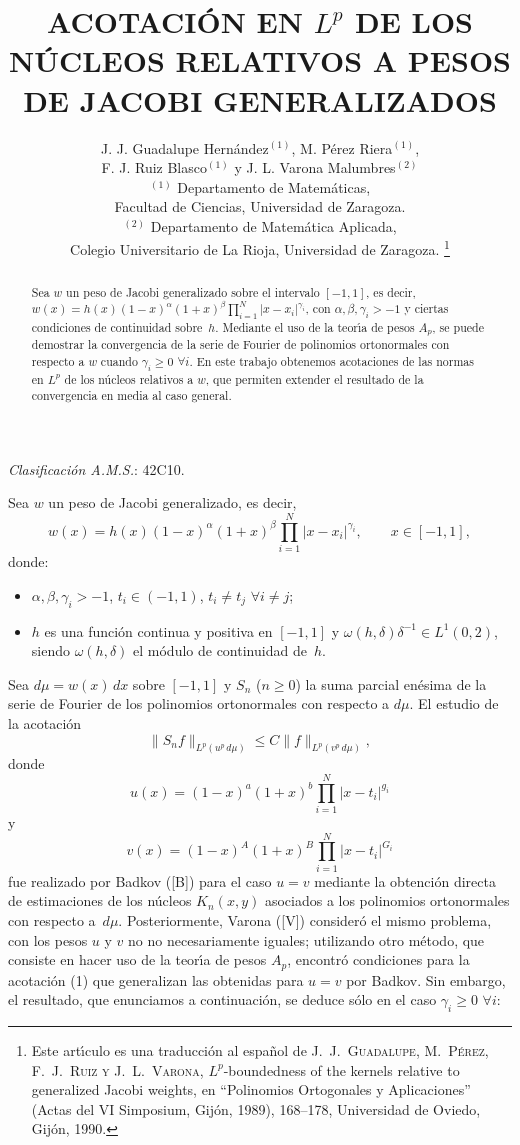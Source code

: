 \documentclass[a4paper,12pt]{article}
\date{}
\title{\large \bfseries \boldmath ACOTACI\'ON EN $L^{p}$ DE LOS N\'UCLEOS
RELATIVOS A PESOS DE JACOBI GENERALIZADOS}
\author{%
J. J. Guadalupe Hern\'andez$^{(1)}$, M. P\'{e}rez Riera$^{(1)}$,\\[2pt]
F. J. Ruiz Blasco$^{(1)}$ y J. L. Varona Malumbres$^{(2)}$\\[5pt]
\small $^{(1)}$ Departamento de Matem\'aticas,\\[-2pt]
\small Facultad de Ciencias, Universidad de Zaragoza.\\[3pt]
\small $^{(2)}$ Departamento de Matem\'atica Aplicada,\\[-2pt]
\small Colegio Universitario de La Rioja, Universidad de Zaragoza.%
\renewcommand\thefootnote{}%
\renewcommand\footnotemark{}%
\footnote{Este art\'{\i}culo es una traducci\'on al espa\~nol de
\textsc{J.~J.~Guadalupe, M.~P\'{e}rez,
F.~J.~Ruiz y J.~L.~Varona},
{$L^{p}$-boundedness of the kernels relative
to generalized Jacobi weights}, en
``Polinomios Ortogonales y Aplicaciones''
(Actas del VI Simposium, Gij\'on, 1989),
168--178, Universidad de Oviedo, Gij\'on, 1990.}%
}
\theoremstyle{plain}
\theoremstyle{definition}
\begin{document}
\maketitle

%

\noindent\textit{Clasificaci\'on A.M.S.}: 42C10.

\begin{abstract}
Sea $w$ un peso de Jacobi generalizado sobre el intervalo $[-1,1]$,
es decir, $w(x) = h(x)(1-x)^{\alpha} (1+x)^{\beta}
\prod_{i=1}^{N} |x-x_{i}|^{\gamma_{i}}$, con $\alpha, \beta,
\gamma_{i} > -1$ y ciertas condiciones de continuidad
sobre~$h$. Mediante el uso de la teor\'{\i}a de pesos $A_{p}$, se puede
demostrar la convergencia de la serie de Fourier de polinomios
ortonormales con respecto a $w$ cuando $\gamma_{i} \geq 0$
$\forall i$. En este trabajo obtenemos acotaciones
de las normas en $L^{p}$ de los n\'ucleos relativos a $w$, que permiten
extender el resultado de la convergencia en media al caso general.
\end{abstract}


Sea $w$ un peso de Jacobi generalizado, es decir,
$$
w(x) = h(x)(1-x)^{\alpha} (1+x)^{\beta}
\prod_{i=1}^{N} |x-x_{i}|^{\gamma_{i}},
\qquad x \in [-1,1],
$$
donde:
\begin{itemize}
\item[(a)] $\alpha, \beta, \gamma_{i} > -1$,
$t_{i} \in (-1,1)$, $t_{i}\neq t_{j}$ $\forall i \neq j$;
\item[(b)] $h$ es una funci\'on continua y positiva en $[-1,1]$ y
$\omega(h,\delta) \delta^{-1} \in L^{1}(0,2)$,
siendo $\omega(h,\delta)$ el m\'odulo de continuidad de~$h$.
\end{itemize}

Sea $d\mu = w(x)\,dx$ sobre $[-1,1]$ y $S_{n}$ ($n \geq 0$)
la suma parcial en\'{e}sima de la serie de Fourier de los polinomios
ortonormales con respecto a $d\mu$. El estudio de la acotaci\'on
\begin{equation}
\| S_{n}f \|_{L^{p}(u^{p}\,d\mu)}
\leq C \| f \|_{L^{p}(v^{p}\,d\mu)},
\tag{1}
\end{equation}
donde
$$
u(x) = (1- x)^{a}(1+ x)^{b} \prod_{i=1}^{N} | x- t_{i} |^{g_{i}}
$$
y
$$
v(x) = (1- x)^{A}(1+ x)^{B} \prod_{i=1}^{N} | x- t_{i} |^{G_{i}}
$$
fue realizado por Badkov ([B]) para el caso $u = v$
mediante la obtenci\'on directa de estimaciones de los n\'ucleos
$K_{n}(x,y)$ asociados a los polinomios ortonormales con respecto a~$d\mu$.
Posteriormente, Varona ([V]) consider\'o el mismo
problema, con los pesos $u$ y $v$ no no necesariamente iguales; utilizando
otro m\'{e}todo, que consiste en hacer uso de la teor\'{\i}a de pesos
$A_{p}$, encontr\'o condiciones para la acotaci\'on (1) que
generalizan las obtenidas para $u = v$ por Badkov.
Sin embargo, el resultado, que enunciamos a continuaci\'on,
se deduce s\'olo en el caso $\gamma_{i} \geq 0$ $\forall i$:
\end{document}

